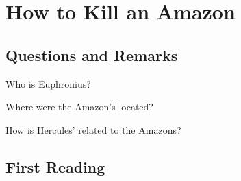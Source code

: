 %
%
%
\chapter{How to Kill an Amazon}
\label{howToAmaz} %








\abstract{}

\section{Questions and Remarks}
\label{sec:QR7}


\begin{qst}
    Who is Euphronius?
\end{qst}


\begin{qst}
    Where were the Amazon's located?
\end{qst}


\begin{qst}
    How is Hercules' related to the Amazons?
\end{qst}





\section{First Reading}
\label{sec:FirRead7}


